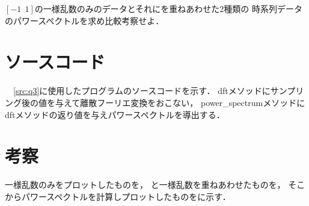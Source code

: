 \documentclass[a4j, 10pt, titlepage]{jsarticle}
\newcommand{\sref}[1]{\lstlistingname ~~\ref{src:#1}}
\begin{document}
{


\clearpage


\li
$[-1 ~~ 1]$の一様乱数のみのデータとそれにを重ねあわせた2種類の
時系列データのパワースペクトルを求め比較考察せよ．



\section*{ソースコード}
\sref{q3}に使用したプログラムのソースコードを示す．
dftメソッドにサンプリング後の値を与えて離散フーリエ変換をおこない，
power\_spectrumメソッドにdftメソッドの返り値を与えパワースペクトルを導出する．


\section*{考察}
一様乱数のみをプロットしたものを，
と一様乱数を重ねあわせたものを，
そこからパワースペクトルを計算しプロットしたものをに示す．

}
\end{document}
